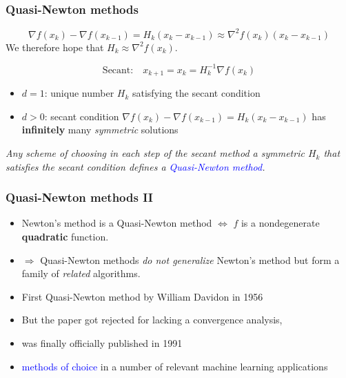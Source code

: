 \documentclass[aspectratio=149]{beamer}
\begin{document}
\begin{frame}
  \frametitle{Quasi-Newton methods}

  \begin{equation}
    \nabla f(x_k) - \nabla f(x_{k-1}) = H_k (x_k - x_{k-1}) \approx \nabla^2 f(x_k) (x_k - x_{k-1})
  \end{equation}
  We therefore hope that $H_k \approx \nabla^2 f(x_k)$.

  \begin{equation}
    \text{Secant:} \quad x_{k+1} = x_k = H_k^{-1} \nabla f(x_k)
  \end{equation}

  \begin{itemize}
    \item $d=1$: unique number $H_k$ satisfying the secant condition
    \item $d>0$: secant condition $\nabla f(x_k) - \nabla f(x_{k-1}) = H_k (x_k - x_{k-1})$ has \textbf{infinitely} many \textit{symmetric} solutions
  \end{itemize}

  \begin{block}{}
    \textit{Any scheme of choosing in each step of the secant method a symmetric $H_k$ that satisfies the secant condition defines a \textcolor{blue}{Quasi-Newton method}.}
  \end{block}


\end{frame}

\begin{frame}
  \frametitle{Quasi-Newton methods II}

  \begin{itemize}
    \item Newton’s method is a Quasi-Newton method $\Leftrightarrow$
          $f$ is a nondegenerate \textbf{quadratic} function.
    \item $\Rightarrow$ Quasi-Newton methods \textit{do not generalize} Newton’s method but form a
          family of \textit{related} algorithms.
    \item First Quasi-Newton method by William Davidon in 1956
    \item But the paper got rejected for lacking a convergence analysis,
    \item was finally officially published in 1991
    \item \textcolor{blue}{methods of choice} in a number of relevant machine learning applications
  \end{itemize}

\end{frame}
\end{document}
